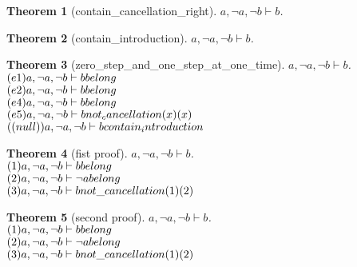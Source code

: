 \documentclass[11pt]{article}
\newtheorem{theorem}{Theorem}
\def\turn{\vdash}
\begin{document}
\begin{theorem}[contain_cancellation_right] $ a, \neg a, \neg b \turn b $.\\
\end{theorem}
\begin{theorem}[contain_introduction] $ a, \neg a, \neg b \turn b $.\\
\end{theorem}
\begin{theorem}[zero_step_and_one_step_at_one_time] $ a, \neg a, \neg b \turn b $.\\
$(e1)a, \neg a, \neg b \turn b \hfill belong  $\\
$(e2)a, \neg a, \neg b \turn b \hfill belong  $\\
$(e4)a, \neg a, \neg b \turn b \hfill belong  $\\
$(e5)a, \neg a, \neg b \turn b \hfill not_cancellation (x)(x) $\\
$((null))a, \neg a, \neg b \turn b \hfill contain_introduction  $\\
\end{theorem}
\begin{theorem}[fist proof] $ a, \neg a, \neg b \turn b $.\\
$(1)a, \neg a, \neg b \turn b \hfill belong $\\
$(2)a, \neg a, \neg b \turn \neg a \hfill belong $\\
$(3)a, \neg a, \neg b \turn b \hfill not \_ cancellation (1)(2) $\\
\end{theorem}
\begin{theorem}[second proof] $ a, \neg a, \neg b \turn b $.\\
$(1)a, \neg a, \neg b \turn b \hfill belong $\\
$(2)a, \neg a, \neg b \turn \neg a \hfill belong $\\
$(3)a, \neg a, \neg b \turn b \hfill not \_ cancellation (1)(2) $\\
\end{theorem}
\end{document}

